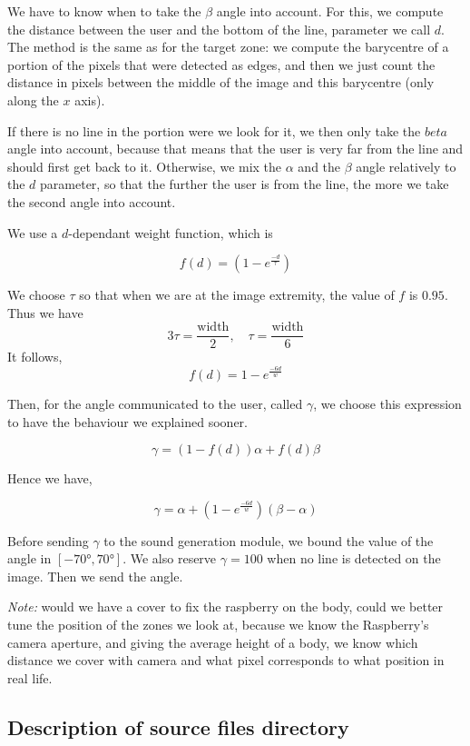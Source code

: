 \documentclass{rapport}
\begin{document}
We have to know when to take the \(\beta\) angle into account. For this, we compute the distance between the user and the bottom of the line, parameter we call \(d\). The method is the same as for the target zone: we compute the barycentre of a portion of the pixels that were detected as edges, and then we just count the distance in pixels between the middle of the image and this barycentre (only along the \(x\) axis). 


If there is no line in the portion were we look for it, we then only take the \(beta\) angle into account, because that means that the user is very far from the line and should first get back to it. Otherwise, we mix the \(\alpha\) and the \(\beta\) angle relatively to the \(d\) parameter, so that the further the user is from the line, the more we take the second angle into account.

We use a \(d\)-dependant weight function, which is

\[ f(d) = (1 - e^{\frac{-d}{\tau}}) \]

We choose \(\tau\) so that when we are at the image extremity, the value of \(f\) is \(0.95\). Thus we have
\[ 3\tau = \frac{\text{width}}{2}, \quad \tau = \frac{\text{width}}{6} \]
It follows,
\[f(d) = 1 - e^{\frac{-6d}{w}}\]

Then, for the angle communicated to the user, called \(\gamma\), we choose this expression to have the behaviour we explained sooner.

\[ \gamma = (1 - f(d))\alpha + f(d)\beta \]

Hence we have,

\[ \gamma = \alpha + (1 - e^{\frac{-6d}{w}})(\beta - \alpha) \]

Before sending \(\gamma\) to the sound generation module, we bound the value of the angle in \([-70°, 70°]\). We also reserve \(\gamma = 100\) when no line is detected on the image. Then we send the angle.

\textit{Note:} would we have a cover to fix the raspberry on the body, could we better tune the position of the zones we look at, because we know the Raspberry's camera aperture, and giving the average height of a body, we know which distance we cover with camera and what pixel corresponds to what position in real life.

\subsection{Description of source files directory}
\end{document}
